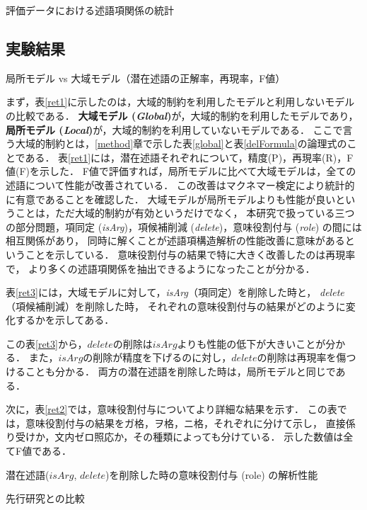 \documentclass[japanese]{jnlp_1.4}
\begin{document}
\begin{table}[b]
\caption{評価データにおける述語項関係の統計}
\label{sts}

\end{table}


\subsection{実験結果}

\begin{table}[b]
  \caption{局所モデル vs 大域モデル（潜在述語の正解率，再現率，F値）}
\label{ret1}

\end{table}

まず，表\ref{ret1}に示したのは，大域的制約を利用したモデルと利用しないモデルの比較である．
\textbf{大域モデル (\textit{Global})}が，大域的制約を利用したモデルであり，
\textbf{局所モデル (\textit{Local})}が，大域的制約を利用していないモデルである．
ここで言う大域的制約とは，\ref{method}章で示した表\ref{global}と表\ref{delFormula}の論理式のことである．
表\ref{ret1}には，潜在述語それぞれについて，精度(P)，再現率(R)，F値(F)を示した．
F値で評価すれば，局所モデルに比べて大域モデルは，全ての述語について性能が改善されている．
この改善はマクネマー検定により統計的に有意であることを確認した．
大域モデルが局所モデルよりも性能が良いということは，ただ大域的制約が有効というだけでなく，
本研究で扱っている三つの部分問題，項同定 (\emph{isArg})，項候補削減 (\emph{delete})，意味役割付与 (\emph{role}) の間には相互関係があり，
同時に解くことが述語項構造解析の性能改善に意味があるということを示している．
意味役割付与の結果で特に大きく改善したのは再現率で，
より多くの述語項関係を抽出できるようになったことが分かる．

表\ref{ret3}には，大域モデルに対して，\emph{isArg}（項同定）を削除した時と，
\emph{delete}（項候補削減）を削除した時，
それぞれの意味役割付与の結果がどのように変化するかを示してある．

この表\ref{ret3}から，$\mathit{delete}$の削除は$\mathit{isArg}$よりも性能の低下が大きいことが分かる．
また，$\mathit{isArg}$の削除が精度を下げるのに対し，$\mathit{delete}$の削除は再現率を傷つけることも分かる．
両方の潜在述語を削除した時は，局所モデルと同じである．

次に，表\ref{ret2}では，意味役割付与についてより詳細な結果を示す．
この表では，意味役割付与の結果をガ格，ヲ格，ニ格，それぞれに分けて示し，
直接係り受けか，文内ゼロ照応か，その種類によっても分けている．
示した数値は全てF値である．

\begin{table}[b]
	\centering
  \caption{潜在述語($\mathit{isArg}$, $\mathit{delete}$)を削除した時の意味役割付与 (role) の解析性能}
\label{ret3}

\end{table}
\begin{table}[b]
\centering
  \caption{先行研究との比較}
\label{ret2}

\end{table}
\end{document}
